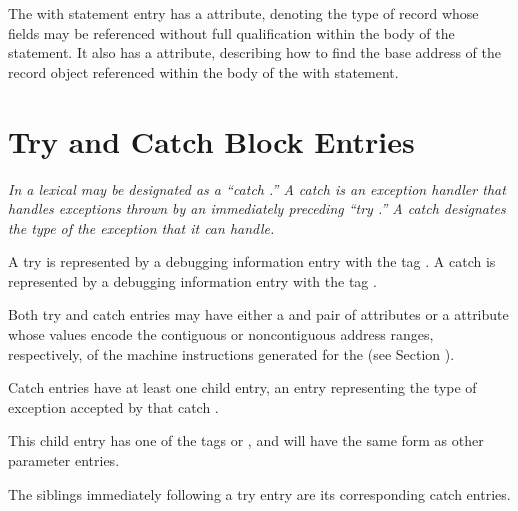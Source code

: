 The with statement entry has a  attribute, denoting
the type of record whose fields may be referenced without full
qualification within the body of the statement. It also has
a  attribute, describing how to find the base
address of the record object referenced within the body of
the with statement.

\section{Try and Catch Block Entries}
\label{chap:tryandcatchblockentries}

\textit{In  a lexical  may be 
designated as a ``catch .'' 
A catch  is an 
exception handler that handles
exceptions thrown by an immediately 
preceding ``try .''
A catch  
designates the type of the exception that it
can handle.}

A try  is represented 
by a debugging information entry
with the tag .  
A catch  is represented by
a debugging information entry with 
the tag .

Both try and catch  entries may have either a
 and 
 pair of attributes 
or 
a
 attribute 
whose values encode the contiguous
or non\dash contiguous address ranges, respectively, of the
machine instructions generated for the 
(see Section
).

Catch  entries have at 
least one child entry, an
entry representing the type of exception accepted by
that catch . 

This child entry has one of 
the 
tags
 or
,
and will have the same form as other parameter entries.

The siblings immediately following 
a try  entry are its
corresponding catch  entries.







